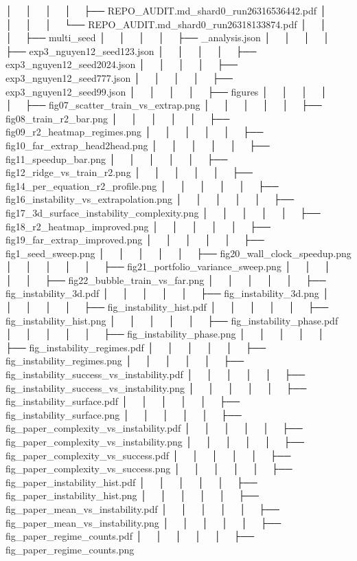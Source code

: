 │   │       │   │   ├── REPO_AUDIT.md_shard0_run26316536442.pdf
│   │       │   │   └── REPO_AUDIT.md_shard0_run26318133874.pdf
│   │       │   ├── multi_seed
│   │       │   │   ├── _analysis.json
│   │       │   │   ├── exp3_nguyen12_seed123.json
│   │       │   │   ├── exp3_nguyen12_seed2024.json
│   │       │   │   ├── exp3_nguyen12_seed777.json
│   │       │   │   ├── exp3_nguyen12_seed99.json
│   │       │   │   ├── figures
│   │       │   │   │   ├── fig07_scatter_train_vs_extrap.png
│   │       │   │   │   ├── fig08_train_r2_bar.png
│   │       │   │   │   ├── fig09_r2_heatmap_regimes.png
│   │       │   │   │   ├── fig10_far_extrap_head2head.png
│   │       │   │   │   ├── fig11_speedup_bar.png
│   │       │   │   │   ├── fig12_ridge_vs_train_r2.png
│   │       │   │   │   ├── fig14_per_equation_r2_profile.png
│   │       │   │   │   ├── fig16_instability_vs_extrapolation.png
│   │       │   │   │   ├── fig17_3d_surface_instability_complexity.png
│   │       │   │   │   ├── fig18_r2_heatmap_improved.png
│   │       │   │   │   ├── fig19_far_extrap_improved.png
│   │       │   │   │   ├── fig1_seed_sweep.png
│   │       │   │   │   ├── fig20_wall_clock_speedup.png
│   │       │   │   │   ├── fig21_portfolio_variance_sweep.png
│   │       │   │   │   ├── fig22_bubble_train_vs_far.png
│   │       │   │   │   ├── fig_instability_3d.pdf
│   │       │   │   │   ├── fig_instability_3d.png
│   │       │   │   │   ├── fig_instability_hist.pdf
│   │       │   │   │   ├── fig_instability_hist.png
│   │       │   │   │   ├── fig_instability_phase.pdf
│   │       │   │   │   ├── fig_instability_phase.png
│   │       │   │   │   ├── fig_instability_regimes.pdf
│   │       │   │   │   ├── fig_instability_regimes.png
│   │       │   │   │   ├── fig_instability_success_vs_instability.pdf
│   │       │   │   │   ├── fig_instability_success_vs_instability.png
│   │       │   │   │   ├── fig_instability_surface.pdf
│   │       │   │   │   ├── fig_instability_surface.png
│   │       │   │   │   ├── fig_paper_complexity_vs_instability.pdf
│   │       │   │   │   ├── fig_paper_complexity_vs_instability.png
│   │       │   │   │   ├── fig_paper_complexity_vs_success.pdf
│   │       │   │   │   ├── fig_paper_complexity_vs_success.png
│   │       │   │   │   ├── fig_paper_instability_hist.pdf
│   │       │   │   │   ├── fig_paper_instability_hist.png
│   │       │   │   │   ├── fig_paper_mean_vs_instability.pdf
│   │       │   │   │   ├── fig_paper_mean_vs_instability.png
│   │       │   │   │   ├── fig_paper_regime_counts.pdf
│   │       │   │   │   ├── fig_paper_regime_counts.png

